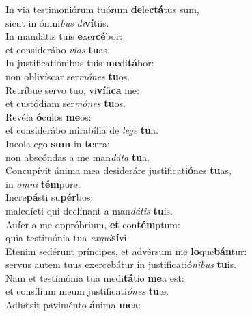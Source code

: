 \evenverse In via testimoniórum tuórum \textbf{de}le\textbf{ctá}tus sum,~\*\\
\evenverse sicut in ómni\textit{bus} \textit{di}\textbf{ví}tiis.\\
\oddverse In mandátis tuis \textbf{e}xer\textbf{cé}bor:~\*\\
\oddverse et considerábo \textit{vi}\textit{as} \textbf{tu}as.\\
\evenverse In justificatiónibus tuis \textbf{me}di\textbf{tá}bor:~\*\\
\evenverse non oblivíscar ser\textit{mó}\textit{nes} \textbf{tu}os.\\
\oddverse Retríbue servo tuo, vi\textbf{ví}fi\textbf{ca} me:~\*\\
\oddverse et custódiam ser\textit{mó}\textit{nes} \textbf{tu}os.\\
\evenverse Revéla \textbf{ó}culos \textbf{me}os:~\*\\
\evenverse et considerábo mirabília de \textit{le}\textit{ge} \textbf{tu}a.\\
\oddverse Incola ego \textbf{sum} in \textbf{ter}ra:~\*\\
\oddverse non abscóndas a me man\textit{dá}\textit{ta} \textbf{tu}a.\\
\evenverse Concupívit ánima mea desideráre justificati\textbf{ó}nes \textbf{tu}as,~\*\\
\evenverse in \textit{om}\textit{ni} \textbf{tém}pore.\\
\oddverse Incre\textbf{pá}sti su\textbf{pér}bos:~\*\\
\oddverse maledícti qui declínant a man\textit{dá}\textit{tis} \textbf{tu}is.\\
\evenverse Aufer a me oppróbrium, \textbf{et} con\textbf{tém}ptum:~\*\\
\evenverse quia testimónia tua \textit{ex}\textit{qui}\textbf{sí}vi.\\
\oddverse Etenim sedérunt príncipes, et advérsum me \textbf{lo}que\textbf{bán}tur:~\*\\
\oddverse servus autem tuus exercebátur in justificatió\textit{ni}\textit{bus} \textbf{tu}is.\\
\evenverse Nam et testimónia tua medi\textbf{tá}tio \textbf{me}a est:~\*\\
\evenverse et consílium meum justificati\textit{ó}\textit{nes} \textbf{tu}æ.\\
\oddverse Adhǽsit paviménto \textbf{á}nima \textbf{me}a:~\*\\
